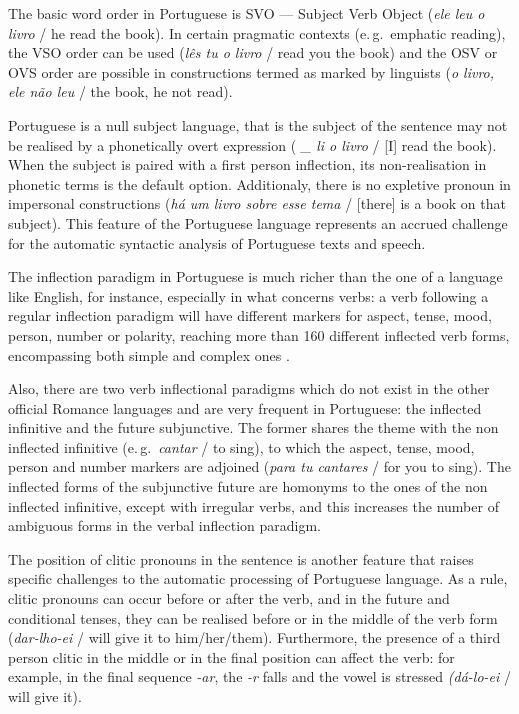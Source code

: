 \begin{multicols}{2}
The basic word order in Portuguese is SVO — Subject Verb Object (\textit{ele leu o livro} / he read the book). 
In certain pragmatic contexts (e.\,g.~emphatic reading), the VSO order can be used (\textit{lês tu o livro} / read you the book) 
and the OSV or OVS order are possible in constructions termed as marked by linguists (\textit{o livro, ele não leu} / the book, he not read).

Portuguese is a null subject language, that is the subject of the sentence may not be realised by a phonetically overt 
expression (\textit{ \_ li o livro} / [I] read the book). 
When the subject is paired with a first person inflection, its non-realisation in phonetic terms is the default option. 
Additionaly, there is no expletive pronoun in impersonal constructions (\textit{há um livro sobre esse tema} / [there] is a book on that subject).
This feature of the Portuguese language represents an accrued challenge for the automatic syntactic analysis of Portuguese texts and speech.

The inflection paradigm in Portuguese is much richer than the one of a language like English, for instance, especially in what concerns verbs: 
a verb following a regular inflection paradigm will have different markers for aspect, tense, mood, person, number or polarity, 
reaching more than 160 different inflected verb forms, encompassing both simple and complex ones \cite{branco}.


Also, there are two verb inflectional paradigms which do not exist in the other official Romance languages and 
are very frequent in Portuguese: the inflected infinitive and the future subjunctive.  
The former shares the theme with the non inflected infinitive (e.\,g.~\textit{cantar} / to sing), to which the aspect, tense, mood, person and number markers are 
adjoined (\textit{para tu cantares} / for you to sing). 
The inflected forms of the subjunctive future are homonyms to the ones of the non inflected infinitive, 
except with irregular verbs, and this increases the number of ambiguous forms in the verbal inflection paradigm.

The position of clitic pronouns in the sentence is another feature that raises specific challenges to the automatic processing of Portuguese language. 
As a rule, clitic pronouns can occur before or after the verb, 
and in the future and conditional tenses, they can be realised before or in the middle of the verb form 
(\textit{dar-lho-ei} / will give it to him/her/them). 
Furthermore, the presence of a third person clitic in the middle or in the final position can affect the verb: 
for example, in the final sequence \textit{-ar}, the \textit{-r} falls and the vowel is stressed \textit{(dá-lo-ei} / will give it).


\end{multicols}
